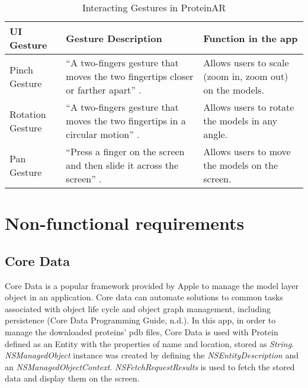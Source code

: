 \begin{table}[h!]
\centering
\begin{tabularx}{\textwidth} {
  | >{\raggedright\arraybackslash}X 
  | >{\raggedright\arraybackslash}X 
  | >{\raggedright\arraybackslash}X | }
\hline
UI Gesture & Gesture Description & Function in the app \\
\hline
\hline
Pinch Gesture & “A two-fingers gesture that moves the two fingertips closer or farther apart” \parencite{wang_beginning_2018}. & Allows users to scale (zoom in, zoom out) on the models. \\
\hline
Rotation Gesture & “A two-fingers gesture that moves the two fingertips in a circular motion” \parencite{wang_beginning_2018}. & Allows users to rotate the models in any angle. \\
\hline
Pan Gesture & “Press a finger on the screen and then slide it across the screen” \parencite{wang_beginning_2018}. & Allows users to move the models on the screen. \\
\hline
\end{tabularx}
\caption {Interacting Gestures in ProteinAR}
\label{tab:gesture}
\end{table}



\section{Non-functional requirements}
\subsection{Core Data}
Core Data is a popular framework provided by Apple to manage the model layer object in an application. Core data can automate solutions to common tasks associated with object life cycle and object graph management, including persistence (Core Data Programming Guide, n.d.). In this app, in order to manage the downloaded proteins’ pdb files, Core Data is used with Protein defined as an Entity with the properties of name and location, stored as \emph{String}. \emph{NSManagedObject} instance was created by defining the \emph{NSEntityDescription} and an \emph{NSManagedObjectContext}. \emph{NSFetchRequestResults} is used to fetch the stored data and display them on the screen. 

